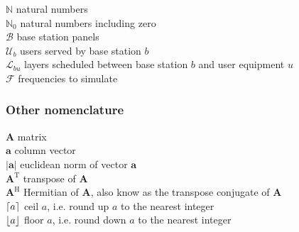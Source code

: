 $\mathbb{N}$ \mytab natural numbers \\
$\mathbb{N}_0$ \mytab natural numbers including zero\\
$\mathcal{B}$ \mytab base station panels\\
$\mathcal{U}_b$ \mytab users served by base station $b$\\ 
$\mathcal{L}_{bu}$ \mytab layers scheduled between base station $b$ and user equipment $u$\\
$\mathcal{F}$ \mytab frequencies to simulate\\


\subsubsection*{Other nomenclature}


$\bm{A}$ \mytab matrix\\
$\bm{a}$ \mytab column vector\\
$|\bm{a}|$ \mytab euclidean norm of vector $\bm{a}$\\
$\bm{A}^\text{T}$ \mytab transpose of $\bm{A}$\\
$\bm{A}^\text{H}$ \mytab Hermitian of $\bm{A}$, also know as the transpose conjugate of $\bm{A}$\\
$\lceil a\rceil$ \mytab ceil $a$, i.e. round up $a$ to the nearest integer\\
$\lfloor a\rfloor$ \mytab floor $a$, i.e. round down $a$ to the nearest integer \\


\clearpage
\thispagestyle{empty}


\cleardoublepage
 \setcounter{page}{1}
\baselineskip 18pt